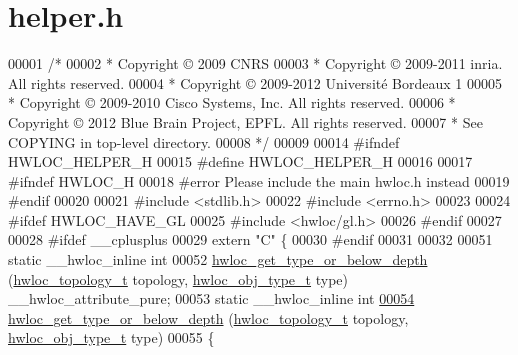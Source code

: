 \hypertarget{a00031_source}{
\section{helper.h}
}

\begin{DoxyCode}
00001 \textcolor{comment}{/*}
00002 \textcolor{comment}{ * Copyright © 2009 CNRS}
00003 \textcolor{comment}{ * Copyright © 2009-2011 inria.  All rights reserved.}
00004 \textcolor{comment}{ * Copyright © 2009-2012 Université Bordeaux 1}
00005 \textcolor{comment}{ * Copyright © 2009-2010 Cisco Systems, Inc.  All rights reserved.}
00006 \textcolor{comment}{ * Copyright © 2012 Blue Brain Project, EPFL. All rights reserved.}
00007 \textcolor{comment}{ * See COPYING in top-level directory.}
00008 \textcolor{comment}{ */}
00009 
00014 \textcolor{preprocessor}{#ifndef HWLOC\_HELPER\_H}
00015 \textcolor{preprocessor}{}\textcolor{preprocessor}{#define HWLOC\_HELPER\_H}
00016 \textcolor{preprocessor}{}
00017 \textcolor{preprocessor}{#ifndef HWLOC\_H}
00018 \textcolor{preprocessor}{}\textcolor{preprocessor}{#error Please include the main hwloc.h instead}
00019 \textcolor{preprocessor}{}\textcolor{preprocessor}{#endif}
00020 \textcolor{preprocessor}{}
00021 \textcolor{preprocessor}{#include <stdlib.h>}
00022 \textcolor{preprocessor}{#include <errno.h>}
00023 
00024 \textcolor{preprocessor}{#ifdef HWLOC\_HAVE\_GL}
00025 \textcolor{preprocessor}{}\textcolor{preprocessor}{#include <hwloc/gl.h>}
00026 \textcolor{preprocessor}{#endif}
00027 \textcolor{preprocessor}{}
00028 \textcolor{preprocessor}{#ifdef \_\_cplusplus}
00029 \textcolor{preprocessor}{}\textcolor{keyword}{extern} \textcolor{stringliteral}{"C"} \{
00030 \textcolor{preprocessor}{#endif}
00031 \textcolor{preprocessor}{}
00032 
00051 \textcolor{keyword}{static} \_\_hwloc\_inline \textcolor{keywordtype}{int}
00052 \hyperlink{a00052_ga081be77905201e9f42318e9974456b45}{hwloc_get_type_or_below_depth} (\hyperlink{a00039_ga9d1e76ee15a7dee158b786c30b6a6e38}{hwloc_topology_t} topology, \hyperlink{a00041_gacd37bb612667dc437d66bfb175a8dc55}{hwloc_obj_type_t} type) 
      \_\_hwloc\_attribute\_pure;
00053 \textcolor{keyword}{static} \_\_hwloc\_inline \textcolor{keywordtype}{int}
\hypertarget{a00031_source_l00054}{}\hyperlink{a00052_ga081be77905201e9f42318e9974456b45}{00054} \hyperlink{a00052_ga081be77905201e9f42318e9974456b45}{hwloc_get_type_or_below_depth} (\hyperlink{a00039_ga9d1e76ee15a7dee158b786c30b6a6e38}{hwloc_topology_t} topology, \hyperlink{a00041_gacd37bb612667dc437d66bfb175a8dc55}{hwloc_obj_type_t} type)
00055 \{

\end{DoxyCode}
